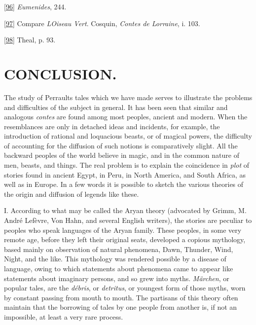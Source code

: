 \documentclass[14pt,a4paper]{memoir}
\begin{document}
\protect\hypertarget{4533318093929944247_33931-h-1.htm.xhtmlux5cux23Footnote_96}{}{}\protect\hyperlink{4533318093929944247_33931-h-1.htm.xhtmlux5cux23FNanchor_96}{{{[}96{]}}}
\emph{Eumenides}, 244.

\protect\hypertarget{4533318093929944247_33931-h-1.htm.xhtmlux5cux23Footnote_97}{}{}\protect\hyperlink{4533318093929944247_33931-h-1.htm.xhtmlux5cux23FNanchor_97}{{{[}97{]}}}
Compare \emph{L\textquotesingle Oiseau Vert}. Cosquin, \emph{Contes de
Lorraine}, i. 103.

\protect\hypertarget{4533318093929944247_33931-h-1.htm.xhtmlux5cux23Footnote_98}{}{}\protect\hyperlink{4533318093929944247_33931-h-1.htm.xhtmlux5cux23FNanchor_98}{{{[}98{]}}}
Theal, p. 93.

\section{CONCLUSION.}

The study of Perrault\textquotesingle s tales which we have made serves
to illustrate the problems and difficulties of the subject in general.
It has been seen that similar and analogous \emph{contes} are found
among most peoples, ancient and modern. When the resemblances are only
in detached ideas and incidents, for example, the introduction of
rational and loquacious beasts, or of magical powers, the difficulty of
accounting for the diffusion of such notions is comparatively slight.
All the backward peoples of the world believe in magic, and in the
common nature of men, beasts, and things. The real problem is to explain
the coincidence in \emph{plot} of stories found in ancient Egypt, in
Peru, in North America, and South Africa, as well as in Europe. In a few
words it is possible to sketch the various theories of the origin and
diffusion of legends like these.

I. According to what may be called the Aryan theory (advocated by Grimm,
M. André Lefèvre, Von Hahn, and several English writers), the stories
are peculiar to peoples who speak languages of the Aryan family. These
peoples, in some very remote age, before they left their original seats,
developed a copious mythology, based mainly on observation of natural
phenomena, Dawn, Thunder, Wind, Night, and the like. This mythology was
rendered possible by a \textquotesingle disease of
language,\textquotesingle{} owing to which statements about phenomena
came to appear like statements about imaginary persons, and so grew into
myths. \emph{Märchen}, or popular tales, are the \emph{débris}, or
\emph{detritus}, or youngest form of those myths, worn by constant
passing from mouth to mouth. The partisans of this theory often maintain
that the borrowing of tales by one people from another is, if not an
impossible, at least a very rare process.
\end{document}
